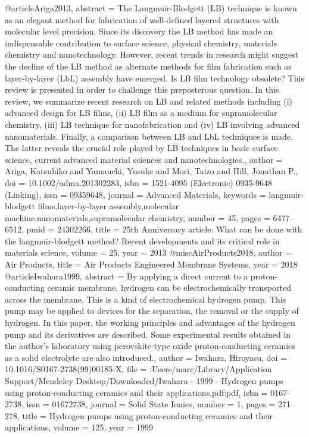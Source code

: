 @article{Ariga2013,
abstract = {The Langmuir-Blodgett (LB) technique is known as an elegant method for fabrication of well-defined layered structures with molecular level precision. Since its discovery the LB method has made an indispensable contribution to surface science, physical chemistry, materials chemistry and nanotechnology. However, recent trends in research might suggest the decline of the LB method as alternate methods for film fabrication such as layer-by-layer (LbL) assembly have emerged. Is LB film technology obsolete? This review is presented in order to challenge this preposterous question. In this review, we summarize recent research on LB and related methods including (i) advanced design for LB films, (ii) LB film as a medium for supramolecular chemistry, (iii) LB technique for nanofabrication and (iv) LB involving advanced nanomaterials. Finally, a comparison between LB and LbL techniques is made. The latter reveals the crucial role played by LB techniques in basic surface science, current advanced material sciences and nanotechnologies.},
author = {Ariga, Katsuhiko and Yamauchi, Yusuke and Mori, Taizo and Hill, Jonathan P.},
doi = {10.1002/adma.201302283},
isbn = {1521-4095 (Electronic) 0935-9648 (Linking)},
issn = {09359648},
journal = {Advanced Materials},
keywords = {langmuir-blodgett films,layer-by-layer assembly,molecular machine,nanomaterials,supramolecular chemistry},
number = {45},
pages = {6477--6512},
pmid = {24302266},
title = {{25th Anniversary article: What can be done with the langmuir-blodgett method? Recent developments and its critical role in materials science}},
volume = {25},
year = {2013}
}
@misc{AirProducts2018,
author = {{Air Products}},
title = {{Air Products Engineered Membrane Systems}},
year = {2018}
}
@article{Iwahara1999,
abstract = {By applying a direct current to a proton-conducting ceramic membrane, hydrogen can be electrochemically transported across the membrane. This is a kind of electrochemical hydrogen pump. This pump may be applied to devices for the separation, the removal or the supply of hydrogen. In this paper, the working principles and advantages of the hydrogen pump and its derivatives are described. Some experimental results obtained in the author's laboratory using perovskite-type oxide proton-conducting ceramics as a solid electrolyte are also introduced.},
author = {Iwahara, Hiroyasu},
doi = {10.1016/S0167-2738(99)00185-X},
file = {:Users/marc/Library/Application Support/Mendeley Desktop/Downloaded/Iwahara - 1999 - Hydrogen pumps using proton-conducting ceramics and their applications.pdf:pdf},
isbn = {0167-2738},
issn = {01672738},
journal = {Solid State Ionics},
number = {1},
pages = {271--278},
title = {{Hydrogen pumps using proton-conducting ceramics and their applications}},
volume = {125},
year = {1999}
}
